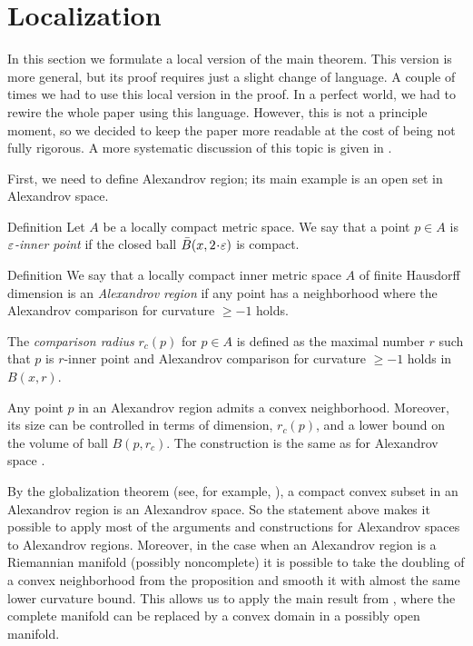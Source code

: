 \section{Localization}\label{sec:local}

In this section we formulate a local version of the main theorem.
This version is more general, but its proof requires just a slight change of language.
A couple of times we had to use this local version in the proof.
In a perfect world, we had to rewire the whole paper using this language.
However, this is not a principle moment,
so we decided to keep the paper more readable at the cost of being not fully rigorous.
A more systematic discussion of this topic is given in \cite{LNep}.

First, we need to define Alexandrov region;
its main example is an open set in Alexandrov space.

\begin{thm}{Definition}
Let $A$ be a locally compact metric space. 
We say that a point  $p\in A$
is \emph{$\varepsilon$-inner point} if
the closed ball $\bar B(x,2\cdot\eps)$ is compact.
\end{thm}

\begin{thm}{Definition}
We say that a locally compact inner metric space $A$ of finite Hausdorff dimension is an \emph{Alexandrov region} if any point has a neighborhood where the Alexandrov comparison for curvature $\ge -1$ holds.

The \emph{comparison radius} $r_c(p)$ for $p\in A$ is defined as the maximal number $r$ such that $p$ is $r$-inner point and Alexandrov comparison for curvature $\ge -1$ holds in $B(x,r)$.
\end{thm}

Any point $p$ in an Alexandrov region admits a convex neighborhood.
Moreover, its size can be controlled in terms of dimension, $r_c(p)$, and a lower bound on the volume of ball $B(p,r_c)$.
The construction is the same as for Alexandrov space \cite[4.3]{perelman-petrunin}.

By the globalization theorem (see, for example, \cite{AKP}), a compact convex subset in an Alexandrov region is an Alexandrov space.
So the statement above makes it possible to apply most of the arguments and constructions for Alexandrov spaces to Alexandrov regions. 
Moreover, in the case when an Alexandrov region is a Riemannian manifold (possibly noncomplete) it is possible to take the doubling of a convex neighborhood from the proposition and smooth it with almost the same lower curvature bound.
This allows us to apply the main result from \cite{petrunin-SC}, where the complete manifold can be replaced by a convex domain in a possibly open manifold. 

